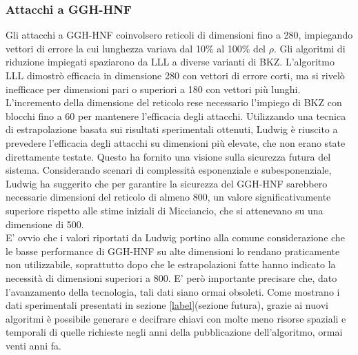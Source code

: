 \subsubsection{Attacchi a GGH-HNF}
Gli attacchi a GGH-HNF coinvolsero reticoli di dimensioni fino a 280, impiegando vettori di errore 
la cui lunghezza variava dal 10\% al 100\% del $\rho$. Gli algoritmi di riduzione impiegati spaziarono da
LLL a diverse varianti di BKZ. L'algoritmo LLL dimostrò efficacia in dimensione 280 con vettori di errore corti,
ma si rivelò inefficace per dimensioni pari o superiori a 180 con vettori più lunghi. 
L'incremento della dimensione del reticolo rese necessario l'impiego di BKZ con blocchi fino a 60 per
mantenere l'efficacia degli attacchi. Utilizzando una tecnica di estrapolazione basata sui risultati sperimentali
ottenuti, 
Ludwig è riuscito a prevedere l'efficacia degli attacchi su dimensioni più elevate, 
che non erano state direttamente testate. Questo ha fornito una visione sulla sicurezza futura del 
sistema. Considerando scenari di complessità esponenziale e subesponenziale, Ludwig ha suggerito 
che per garantire la sicurezza del GGH-HNF sarebbero necessarie dimensioni del reticolo di almeno 800, 
un valore significativamente superiore rispetto alle stime iniziali di Micciancio, 
che si attenevano su una dimensione di 500.\\

E' ovvio che i valori riportati da Ludwig portino alla comune considerazione che le basse performance
di GGH-HNF su alte dimensioni lo rendano praticamente non utilizzabile, soprattutto dopo che 
le estrapolazioni fatte hanno indicato la necessità di dimensioni superiori a 800. E' 
però importante precisare che, dato l'avanzamento della tecnologia, tali dati siano ormai obsoleti.
Come mostrano i dati sperimentali presentati in sezione \ref{label}(sezione futura), grazie ai nuovi
algoritmi è possibile generare e decifrare chiavi con molte meno risorse spaziali e
temporali di quelle richieste negli anni della pubblicazione dell'algoritmo, ormai venti anni fa. 